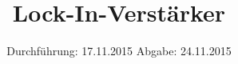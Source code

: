 

\subject{303}
\title{Lock-In-Verstärker}
\date{
  Durchführung: 17.11.2015
  \hspace{3em}
  Abgabe: 24.11.2015
}



\maketitle
\newpage
\thispagestyle{empty}
\tableofcontents
\newpage





\printbibliography



